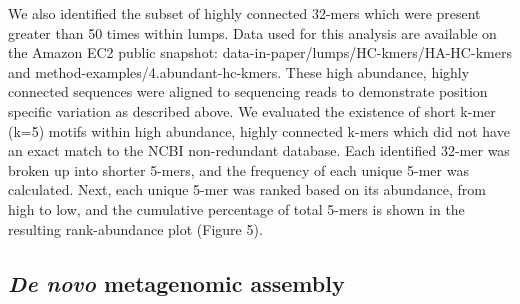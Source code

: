 \documentclass[10pt]{article}
\begin{document}
We also identified the subset of highly connected 32-mers which were
present greater than 50 times within lumps. Data used for this
analysis are available on the Amazon EC2 public snapshot:
data-in-paper/lumps/HC-kmers/HA-HC-kmers and
method-examples/4.abundant-hc-kmers. These high abundance, highly
connected sequences were aligned to sequencing reads to demonstrate
position specific variation as described above.  We evaluated the
existence of short k-mer (k=5) motifs within high abundance, highly
connected k-mers which did not have an exact match to the NCBI
non-redundant database.  Each identified 32-mer was broken up into
shorter 5-mers, and the frequency of each unique 5-mer was calculated.
Next, each unique 5-mer was ranked based on its abundance, from high
to low, and the cumulative percentage of total 5-mers is shown in the
resulting rank-abundance plot (Figure 5).
  
\subsection*{\emph{De novo} metagenomic assembly}
\end{document}
